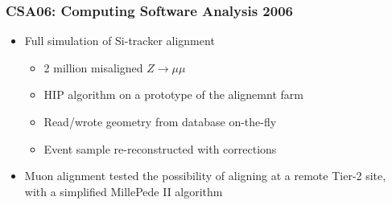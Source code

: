 \documentclass[compress]{beamer}
\begin{document}
\begin{frame}
\frametitle{CSA06: Computing Software Analysis 2006}
\begin{itemize}
\item Full simulation of Si-tracker alignment
\begin{itemize}
\item 2 million misaligned $Z\to\mu\mu$
\item HIP algorithm on a prototype of the alignemnt farm
\item Read/wrote geometry from database on-the-fly
\item Event sample re-reconstructed with corrections
\end{itemize}

\vfill
\item Muon alignment tested the possibility of aligning at a remote
Tier-2 site, with a simplified MillePede II algorithm
\end{itemize}
\end{frame}
\end{document}
